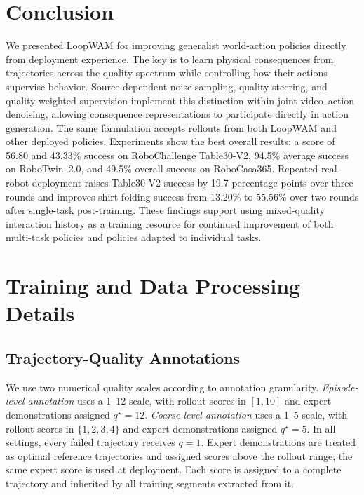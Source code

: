 \section{Conclusion}
\label{sec:conclusion}

We presented LoopWAM for improving generalist world-action policies directly from deployment experience.
The key is to learn physical consequences from trajectories across the quality spectrum while controlling how their actions supervise behavior.
Source-dependent noise sampling, quality steering, and quality-weighted supervision implement this distinction within joint video--action denoising, allowing consequence representations to participate directly in action generation.
The same formulation accepts rollouts from both LoopWAM and other deployed policies. Experiments show the best overall results: a score of 56.80 and 43.33\% success on RoboChallenge Table30-V2, 94.5\% average success on RoboTwin~2.0, and 49.5\% overall success on RoboCasa365.
Repeated real-robot deployment raises Table30-V2 success by 19.7 percentage points over three rounds and improves shirt-folding success from 13.20\% to 55.56\% over two rounds after single-task post-training.
These findings support using mixed-quality interaction history as a training resource for continued improvement of both multi-task policies and policies adapted to individual tasks.

\clearpage
\appendix

\clearpage
\appendix

\section{Training and Data Processing Details}
\label{app:implementation}

\subsection{Trajectory-Quality Annotations}
\label{app:quality_annotations}

We use two numerical quality scales according to annotation granularity.
\emph{Episode-level annotation} uses a 1--12 scale, with rollout scores in $[1,10]$ and expert demonstrations assigned $q^\star=12$.
\emph{Coarse-level annotation} uses a 1--5 scale, with rollout scores in $\{1,2,3,4\}$ and expert demonstrations assigned $q^\star=5$.
In all settings, every failed trajectory receives $q=1$.
Expert demonstrations are treated as optimal reference trajectories and assigned scores above the rollout range; the same expert score is used at deployment.
Each score is assigned to a complete trajectory and inherited by all training segments extracted from it.

